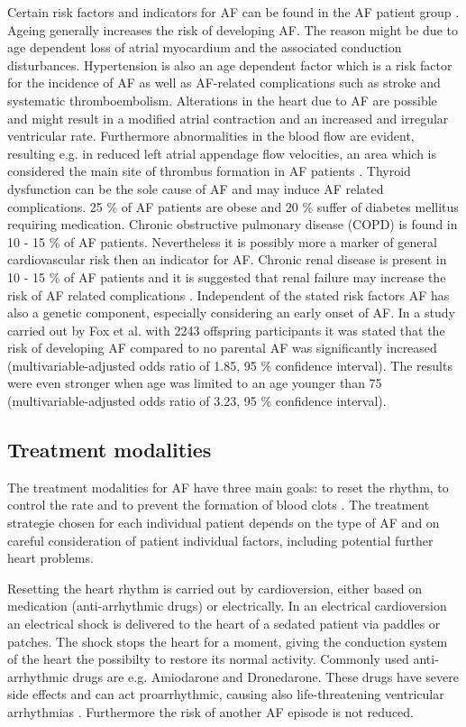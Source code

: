 \documentclass[type=dr, dr=rernat, accentcolor=tud7b,colorbacktitle, bigchapter, openright, twoside, 12pt ]{tudthesis}
\begin{document}
Certain risk factors and indicators for AF can be found in the AF patient group \cite{CE09}. Ageing generally increases the risk of 
developing AF. The reason might be due to age dependent loss of atrial myocardium and the associated conduction disturbances. Hypertension 
is also an age dependent factor which is a risk factor for the incidence of AF as well as AF-related complications such as stroke and 
systematic thromboembolism. Alterations in the heart due to AF are possible and might result in a modified atrial contraction and an 
increased and irregular ventricular rate. Furthermore abnormalities in the blood flow are evident, resulting e.g. in reduced left atrial 
appendage flow velocities, an area which is considered the main site of thrombus formation in AF patients \cite{ESC12}. Thyroid dysfunction
can be the sole cause of AF and may induce AF related complications. 25 \% of AF patients are obese \cite{Nab09} and 20 \% suffer of 
diabetes mellitus requiring medication. Chronic obstructive pulmonary 
disease (COPD) is found in 10 - 15 \% of AF patients. Nevertheless it is possibly more a marker of general cardiovascular risk then an 
indicator for AF. Chronic renal disease is present in 10 - 15 \% of AF patients and it is suggested that renal failure may increase the 
risk of AF related complications \cite{CE09}. Independent of the stated risk factors AF has also a genetic component, especially 
considering an early onset of AF. In a study carried out by Fox et al. \cite{Fox09} with 2243 offspring participants it was stated that the 
risk of developing AF compared to no parental AF was significantly increased (multivariable-adjusted odds ratio of 1.85, 95 \% confidence 
interval). The results were even stronger when age was limited to an age younger than 75 (multivariable-adjusted odds ratio of 3.23, 95 \% 
confidence interval). 


\subsection{Treatment modalities}

The treatment modalities for AF have three main goals: to reset the rhythm, to control the rate and to prevent the formation of blood 
clots \cite{Mayo} \cite{CE09}. The treatment strategie chosen for each individual patient depends on the type of AF and on careful 
consideration of patient individual factors, including potential further heart problems. \newline

Resetting the heart rhythm is carried out by cardioversion, either based on medication (anti-arrhythmic drugs) or electrically. In an 
electrical cardioversion an electrical shock is delivered to the heart of a sedated patient via paddles or patches. The shock stops the 
heart for a moment, giving the conduction system of the heart the possibilty to restore its normal activity. Commonly used anti-arrhythmic 
drugs are e.g. Amiodarone and Dronedarone. These drugs have severe side effects and can act proarrhythmic, causing also 
life-threatening ventricular arrhythmias \cite{Mayo}. Furthermore the risk of another AF episode is not reduced.\newline
\end{document}
